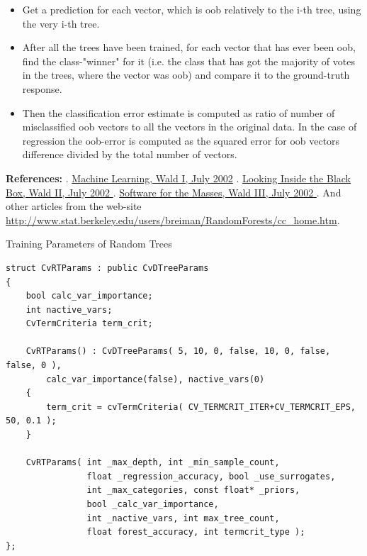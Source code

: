 \begin{itemize}
\item{Get a prediction for each vector, which is oob relatively to the i-th tree, using the very i-th tree.}
\item{After all the trees have been trained, for each vector that has ever been oob, find the class-"winner" for it (i.e. the class that has got the majority of votes in the trees, where the vector was oob) and compare it to the ground-truth response.}
\item{Then the classification error estimate is computed as ratio of number of misclassified oob vectors to all the vectors in the original data. In the case of regression the oob-error is computed as the squared error for oob vectors difference divided by the total number of vectors.}
\end{itemize}

\textbf{References:}
. \href{http://stat-www.berkeley.edu/users/breiman/wald2002-1.pdf}{Machine Learning, Wald I, July 2002}
. \href{http://stat-www.berkeley.edu/users/breiman/wald2002-2.pdf}{Looking Inside the Black Box, Wald II, July 2002 }
. \href{http://stat-www.berkeley.edu/users/breiman/wald2002-3.pdf}{Software for the Masses, Wald III, July 2002 }
. And other articles from the web-site \url{http://www.stat.berkeley.edu/users/breiman/RandomForests/cc_home.htm}.



Training Parameters of Random Trees

\begin{lstlisting}
struct CvRTParams : public CvDTreeParams
{
    bool calc_var_importance;
    int nactive_vars;
    CvTermCriteria term_crit;

    CvRTParams() : CvDTreeParams( 5, 10, 0, false, 10, 0, false, false, 0 ),
        calc_var_importance(false), nactive_vars(0)
    {
        term_crit = cvTermCriteria( CV_TERMCRIT_ITER+CV_TERMCRIT_EPS, 50, 0.1 );
    }

    CvRTParams( int _max_depth, int _min_sample_count,
                float _regression_accuracy, bool _use_surrogates,
                int _max_categories, const float* _priors,
                bool _calc_var_importance,
                int _nactive_vars, int max_tree_count,
                float forest_accuracy, int termcrit_type );
};
\end{lstlisting}

